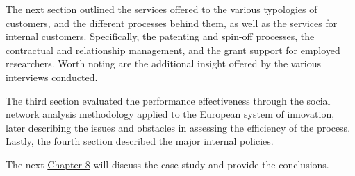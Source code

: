 The next section outlined the services offered to the various typologies of customers, and the different processes behind them, as well as the services for internal customers. Specifically, the patenting and spin-off processes, the contractual and relationship management, and the grant support for employed researchers. Worth noting are the additional insight offered by the various interviews conducted.

The third section evaluated the performance effectiveness through the social network analysis methodology applied to the European system of innovation, later describing the issues and obstacles in assessing the efficiency of the process. Lastly, the fourth section described the major internal policies.

The next \hyperref[Chapter8]{Chapter 8} will discuss the case study and provide the conclusions. 